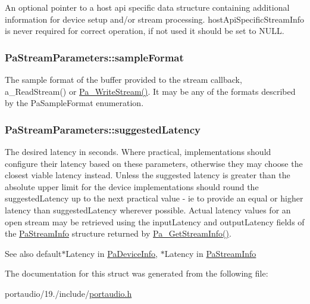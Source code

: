 An optional pointer to a host api specific data structure containing additional information for device setup and/or stream processing. host\+Api\+Specific\+Stream\+Info is never required for correct operation, if not used it should be set to N\+U\+L\+L. \hypertarget{struct_pa_stream_parameters_ad8d2d3063757b812f9e5f8709f41052b}{
\subsubsection[{sample\+Format}]{ Pa\+Stream\+Parameters\+::sample\+Format}}\label{struct_pa_stream_parameters_ad8d2d3063757b812f9e5f8709f41052b}
The sample format of the buffer provided to the stream callback, a\+\_\+\+Read\+Stream() or \hyperlink{portaudio_8h_a075a6efb503a728213bdae24347ed27d}{Pa\+\_\+\+Write\+Stream()}. It may be any of the formats described by the Pa\+Sample\+Format enumeration. \hypertarget{struct_pa_stream_parameters_aa1e80ac0551162fd091db8936ccbe9a0}{
\subsubsection[{suggested\+Latency}]{ Pa\+Stream\+Parameters\+::suggested\+Latency}}\label{struct_pa_stream_parameters_aa1e80ac0551162fd091db8936ccbe9a0}
The desired latency in seconds. Where practical, implementations should configure their latency based on these parameters, otherwise they may choose the closest viable latency instead. Unless the suggested latency is greater than the absolute upper limit for the device implementations should round the suggested\+Latency up to the next practical value -\/ ie to provide an equal or higher latency than suggested\+Latency wherever possible. Actual latency values for an open stream may be retrieved using the input\+Latency and output\+Latency fields of the \hyperlink{struct_pa_stream_info}{Pa\+Stream\+Info} structure returned by \hyperlink{portaudio_8h_a3d9c4cbda4e9f381b76f287c3de8a758}{Pa\+\_\+\+Get\+Stream\+Info()}. \begin{DoxySeeAlso}{See also}
default$\ast$\+Latency in \hyperlink{struct_pa_device_info}{Pa\+Device\+Info}, $\ast$\+Latency in \hyperlink{struct_pa_stream_info}{Pa\+Stream\+Info} 
\end{DoxySeeAlso}


The documentation for this struct was generated from the following file\+:\begin{DoxyCompactItemize}
\item 
portaudio/19./include/\hyperlink{portaudio_8h}{portaudio.\+h}\end{DoxyCompactItemize}
